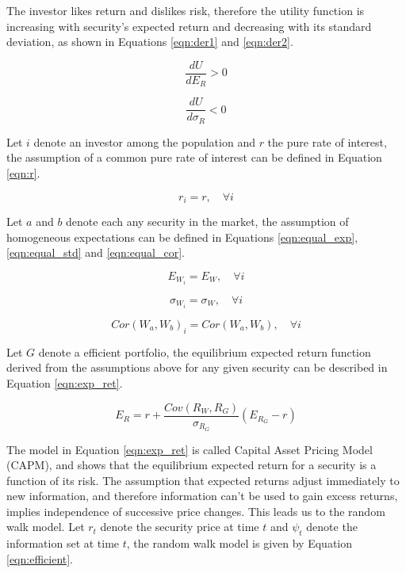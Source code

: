 \documentclass[cic,tc, english]{iiufrgs}
\begin{document}
    The investor likes return and dislikes risk, therefore the utility function is increasing with security's expected return and decreasing with its standard deviation, as shown in Equations \ref{eqn:der1} and \ref{eqn:der2}.
    
    \begin{equation}
        \label{eqn:der1}
        \frac{dU}{dE_R} > 0
    \end{equation}

    \begin{equation}
        \label{eqn:der2}
        \frac{dU}{d\sigma_R} < 0
    \end{equation}

    Let $i$ denote an investor among the population and $r$ the pure rate of interest, the assumption of a common pure rate of interest can be defined in Equation \ref{eqn:r}.

    \begin{equation}
        \label{eqn:r}
        r_i = r, \quad \forall i
    \end{equation}

    Let $a$ and $b$ denote each any security in the market, the assumption of homogeneous expectations can be defined in Equations \ref{eqn:equal_exp}, \ref{eqn:equal_std} and \ref{eqn:equal_cor}.

    \begin{equation}
        \label{eqn:equal_exp}
        E_{W_i} = E_W, \quad \forall i
    \end{equation}

    \begin{equation}
        \label{eqn:equal_std}
        \sigma_{W_i} = \sigma_W, \quad \forall i
    \end{equation}

    \begin{equation}
        \label{eqn:equal_cor}
        Cor(W_a, W_b)_i = Cor(W_a, W_b), \quad \forall i
    \end{equation}

    Let $G$ denote a efficient portfolio, the equilibrium expected return function derived from the assumptions above for any given security can be described in Equation \ref{eqn:exp_ret}.

    \begin{equation}
        \label{eqn:exp_ret}
        E_R = r + \frac{Cov(R_W, R_G)}{\sigma_{R_G}} (E_{R_G} - r)
    \end{equation}

    The model in Equation \ref{eqn:exp_ret} is called Capital Asset Pricing Model (CAPM), and shows that the equilibrium expected return for a security is a function of its risk. The assumption that expected returns adjust immediately to new information, and therefore information can't be used to gain excess returns, implies independence of successive price changes. This leads us to the random walk model. Let $r_t$ denote the security price at time $t$ and $\psi_t$ denote the information set at time $t$, the random walk model is given by Equation \ref{eqn:efficient}.
\end{document}
